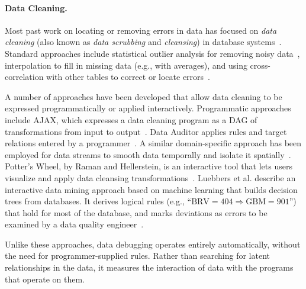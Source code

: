 
\paragraph{Data Cleaning.}
Most past work on locating or removing errors in data has focused
on \emph{data cleaning} (also known as \emph{data scrubbing}
and \emph{cleansing}) in database
systems~\cite{DBLP:journals/debu/RahmD00,han2006data}. Standard
approaches include statistical outlier analysis for removing noisy
data~\cite{1583581}, interpolation to fill in missing data (e.g., with
averages), and using cross-correlation with other tables to correct or
locate errors~\cite{Hernandez:1995:MPL:223784.223807}.




A number of approaches have been developed that allow data cleaning to
be expressed programmatically or applied interactively. Programmatic
approaches include AJAX, which expresses a data cleaning program as a
DAG of transformations from input to
output~\cite{Galhardas:2000:AED:342009.336568}. Data Auditor applies
rules and target relations entered by a
programmer~\cite{Golab:2010:DAE:1920841.1921060}. A similar
domain-specific approach has been employed for data streams to smooth
data temporally and isolate it spatially~\cite{1617508}. Potter's
Wheel, by Raman and Hellerstein, is an interactive tool that lets
users visualize and apply data cleansing
transformations~\cite{Raman:2001:PWI:645927.672045}.  Luebbers et
al. describe an interactive data mining approach based on machine
learning that builds decision trees from databases. It derives logical
rules (e.g., ``$\mbox{BRV} = 404 \Rightarrow \mbox{GBM} = 901$'') that
hold for most of the database, and marks deviations as errors to be
examined by a data quality
engineer~\cite{Luebbers:2003:SDD:1315451.1315499}.

Unlike these approaches, data debugging operates entirely
automatically, without the need for programmer-supplied rules.  Rather
than searching for latent relationships in the data, it measures the
interaction of data with the programs that operate on them.
 

